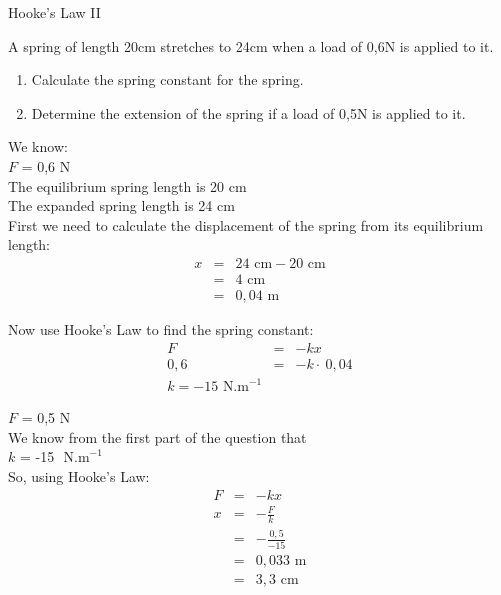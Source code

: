 \begin{wex}{Hooke's Law II}{
A spring of length 20cm stretches to 24cm when a load of 0,6N is applied to it.

\begin{enumerate}
\item Calculate the spring constant for the spring.\\

\item Determine the extension of the spring if a load of 0,5N is applied to it.\\

\end{enumerate}

}

{
We know: \\
$F$ = 0,6 N \\
The equilibrium spring length is 20 cm \\
The expanded spring length is 24 cm \\

First we need to calculate the displacement of the spring from its equilibrium length: \\
\begin{eqnarray*}
x & = & 24 \textrm{ cm} - 20 \textrm{ cm}\\
& = & 4 \textrm{ cm}\\
& = & 0,04 \textrm{ m}
\end{eqnarray*}

Now use Hooke's Law to find the spring constant: \\
\begin{eqnarray*}
F & = & -kx \\
0,6 & = & -k \cdot \: 0,04\\
k = -15  \textrm{ N.m}^{-1}
\end{eqnarray*}

$F$ = 0,5 N \\
We know from the first part of the question that \\
$k$ = -15 $\textrm{ N.m}^{-1}$ \\

So, using Hooke's Law: \\

\begin{eqnarray*}
F & = & -kx \\
x & = & -\frac{F}{k} \\
& = & -\frac{0,5}{-15}\\
& = & 0,033 \textrm{ m}\\
& = & 3,3 \textrm{ cm}\\
\end{eqnarray*}
}

\end{wex}

